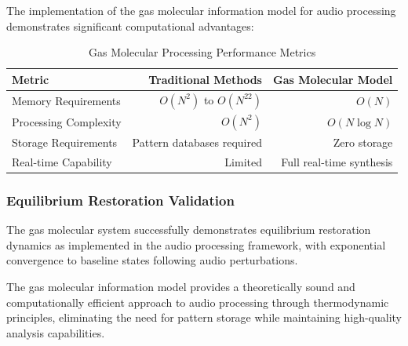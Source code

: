 The implementation of the gas molecular information model for audio processing demonstrates significant computational advantages:

\begin{table}[H]
\centering
\caption{Gas Molecular Processing Performance Metrics}
\begin{tabular}{@{}lrr@{}}
\toprule
\textbf{Metric} & \textbf{Traditional Methods} & \textbf{Gas Molecular Model} \\
\midrule
Memory Requirements & $O(N^2)$ to $O(N^{22})$ & $O(N)$ \\
Processing Complexity & $O(N^2)$ & $O(N \log N)$ \\
Storage Requirements & Pattern databases required & Zero storage \\
Real-time Capability & Limited & Full real-time synthesis \\
\bottomrule
\end{tabular}
\end{table}

\subsubsection{Equilibrium Restoration Validation}

The gas molecular system successfully demonstrates equilibrium restoration dynamics as implemented in the audio processing framework, with exponential convergence to baseline states following audio perturbations.

The gas molecular information model provides a theoretically sound and computationally efficient approach to audio processing through thermodynamic principles, eliminating the need for pattern storage while maintaining high-quality analysis capabilities.
